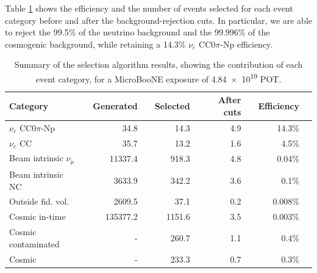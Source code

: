 Table \ref{tab:effafter} shows the efficiency and the number of events selected for each event category before and after the background-rejection cuts. In particular, we are able to reject the 99.5\% of the neutrino background and the 
99.996\% of the cosmogenic background, while retaining a 14.3\% $\nu_{e}$ CC0$\pi$-Np efficiency.

\begin{table}[htbp]
   \centering
   \begin{tabular}{llrrrrrrrr}
     \toprule
     Category & \phantom{a} & Generated & \phantom{a} & Selected & \phantom{a} & After cuts & \phantom{a} & Efficiency\\
     \midrule

     $\nu_{e}$ CC0$\pi$-Np       & & 34.8     & & 14.3   & & 4.9   & & 14.3\%\\
     $\nu_{e}$ CC                & & 35.7     & & 13.2   & & 1.6   & & 4.5\%\\
     Beam intrinsic $\nu_{\mu}$  & & 11337.4  & & 918.3  & & 4.8   & & 0.04\%\\
     Beam intrinsic NC           & & 3633.9   & & 342.2  & & 3.6   & & 0.1\%\\
     Outside fid. vol.           & & 2609.5   & & 37.1   & & 0.2   & & 0.008\%\\
     Cosmic in-time              & & 135377.2 & & 1151.6 & & 3.5   & & 0.003\%\\
     Cosmic contaminated         & & -        & & 260.7  & & 1.1   & & 0.4\%\\
     Cosmic                      & & -        & & 233.3  & & 0.7   & & 0.3\%\\

     \bottomrule
   \end{tabular}
   \caption{Summary of the selection algorithm results, showing the contribution of each event category, for a MicroBooNE exposure of \num{4.84e19} POT.}\label{tab:effafter}
\end{table}

